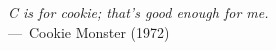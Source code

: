 
\vspace*{\fill}

\begin{epigraph}
\emph{C is for cookie; that's good enough for me.} \\---~Cookie Monster (1972)
\end{epigraph}


\vspace*{\fill}